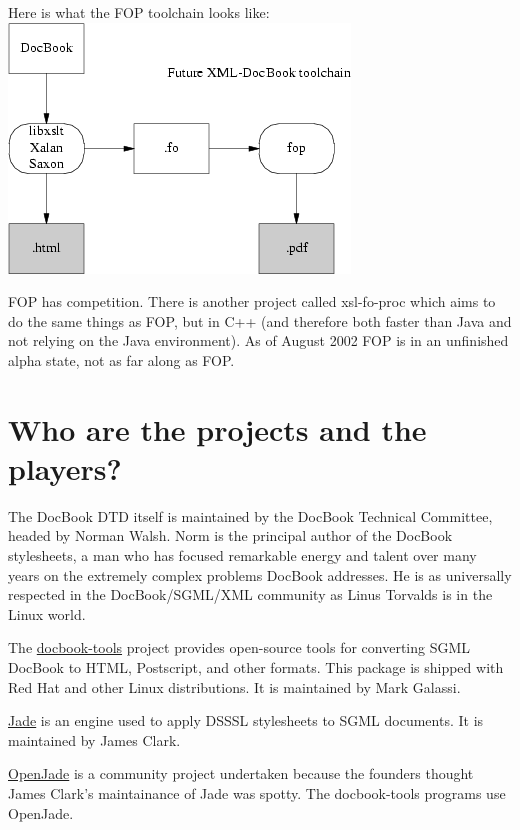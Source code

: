 \documentclass[pdftex,english,a4paper,10pt]{infocom}
\begin{document}
Here is what the FOP toolchain looks like:
{{\includegraphics[]{figure3.png}}}

FOP has competition.  There is another project called
xsl-fo-proc
which aims to do the same things as FOP, but in C++ (and therefore
both faster than Java and not relying on the Java environment).  As of
August 2002 FOP is in an unfinished alpha state, not as far along as
FOP.

\section{Who are the projects and the players?}
\label{id2719568}\hypertarget{id2719568}{}%

The DocBook DTD itself is maintained by the DocBook Technical
Committee, headed by Norman Walsh.  Norm is the principal author of
the DocBook stylesheets, a man who has focused remarkable energy and
talent over many years on the extremely complex problems DocBook
addresses.  He is as universally respected in the DocBook/SGML/XML
community as Linus Torvalds is in the Linux world.

The \href{http://sources.redhat.com/docbook-tools/}{
docbook-tools} project provides open-source tools for
converting SGML DocBook to HTML, Postscript, and other formats.  This
package is shipped with Red Hat and other Linux distributions.  It is
maintained by Mark Galassi.

\href{http://www.jclark.com/jade/}{Jade} is an
engine used to apply DSSSL stylesheets to SGML documents.  It is
maintained by James Clark.

\href{http://openjade.sourceforge.net/}{OpenJade}
is a community project undertaken because the founders thought James
Clark's maintainance of Jade was spotty. The docbook-tools programs
use OpenJade.
\end{document}

